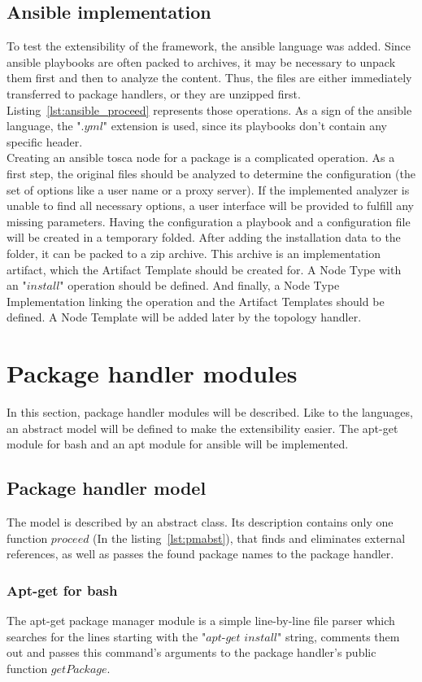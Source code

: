 \subsection*{Ansible implementation}
To test the extensibility of the framework, the ansible language was added.
Since ansible playbooks are often packed to archives, it may be necessary to unpack them first and then to analyze the content.
Thus, the files are either immediately transferred to package handlers, or they are unzipped first.
Listing~\ref{lst:ansible_proceed} represents those operations.
As a sign of the ansible language, the ".$yml$" extension is used, since its playbooks don't contain any specific header.\\
Creating an ansible \gls{tosca} node for a package is a complicated operation. 
As a first step, the original files should be analyzed to determine the configuration (the set of options like a user name or a proxy server).
If the implemented analyzer is unable to find all necessary options, a user interface will be provided to fulfill any missing parameters.
Having the configuration a playbook and a configuration file will be created in a temporary folded.
After adding the installation data to the folder, it can be packed to a zip archive.
This archive is an implementation artifact, which the Artifact Template should be created for.
A Node Type with an "$install$" operation %
should be defined.
And finally, a Node Type Implementation linking the operation and the Artifact Templates should be defined.
A Node Template will be added later by the topology handler.

\section{Package handler modules}
In this section, package handler modules will be described.
Like to the languages, an abstract model will be defined to make the extensibility easier.
The apt-get module for bash and an apt module for ansible will be implemented.
\subsection*{Package handler model}
The model is described by an abstract class.
Its description contains only one function $proceed$ (In the listing~\ref{lst:pmabst}), that finds and eliminates external references, as well as passes the found package names to the package handler.
\subsubsection*{Apt-get for bash}
The apt-get package manager module is a simple line-by-line file parser which searches for the lines starting with the "$apt$-$get$ $install$" string, comments them out and passes this command's arguments to the package handler's public function $getPackage$. 
